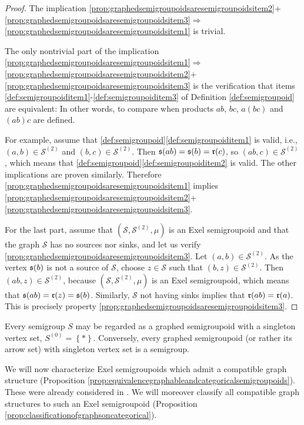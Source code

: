 \begin{proof}
    The implication \ref{prop:graphedsemigroupoidsaresemigroupoidsitem2}+\ref{prop:graphedsemigroupoidsaresemigroupoidsitem3}$\Rightarrow$\ref{prop:graphedsemigroupoidsaresemigroupoidsitem1} is trivial.
    
    The only nontrivial part of the implication \ref{prop:graphedsemigroupoidsaresemigroupoidsitem1}$\Rightarrow$\ref{prop:graphedsemigroupoidsaresemigroupoidsitem2}+\ref{prop:graphedsemigroupoidsaresemigroupoidsitem3} is the verification that items \ref{def:semigroupoiditem1}-\ref{def:semigroupoiditem3} of Definition \ref{def:semigroupoid} are equivalent: In other words, to compare when products $ab$, $bc$, $a(bc)$ and $(ab)c$ are defined.
    
    For example, assume that \ref{def:semigroupoid}\ref{def:semigroupoiditem1} is valid, i.e., $(a,b)\in\mathcal{S
    }^{(2)}$ and $(b,c)\in\mathcal{S
    }^{(2)}$. Then $\operatorname{\mathfrak{s}}(ab)=\operatorname{\mathfrak{s}}(b)=\operatorname{\mathfrak{r}}(c)$, so $(ab,c)\in\mathcal{S
    }^{(2)}$, which means that \ref{def:semigroupoid}\ref{def:semigroupoiditem2} is valid. The other implications are proven similarly. Therefore \ref{prop:graphedsemigroupoidsaresemigroupoidsitem1} implies \ref{prop:graphedsemigroupoidsaresemigroupoidsitem2}+\ref{prop:graphedsemigroupoidsaresemigroupoidsitem3}.
    
    For the last part, assume that $(\mathcal{S
    },\mathcal{S
    }^{(2)},\mu)$ is an Exel semigroupoid and that the graph $\mathcal{S
    }$ has no sources nor sinks, and let us verify \ref{prop:graphedsemigroupoidsaresemigroupoidsitem3}. Let $(a,b)\in\mathcal{S
    }^{(2)}$. As the vertex $\operatorname{\mathfrak{s}}(b)$ is not a source of $\mathcal{S
    }$, choose $z\in\mathcal{S
    }$ such that $(b,z)\in\mathcal{S
    }^{(2)}$. Then $(ab,z)\in\mathcal{S
    }^{(2)}$, because $(\mathcal{S
    },\mathcal{S
    }^{(2)},\mu)$ is an Exel semigroupoid, which means that $\operatorname{\mathfrak{s}}(ab)=\operatorname{\mathfrak{r}}(z)=\operatorname{\mathfrak{s}}(b)$. Similarly, $\mathcal{S
    }$ not having sinks implies that $\operatorname{\mathfrak{r}}(ab)=\operatorname{\mathfrak{r}}(a)$. This is precisely property \ref{prop:graphedsemigroupoidsaresemigroupoidsitem3}.\qedhere
\end{proof}

\begin{example}
Every semigroup $S$ may be regarded as a graphed semigroupoid with a singleton vertex set, $S^{(0)}=\left\{\ast\right\}$. Conversely, every graphed semigroupoid (or rather its arrow set) with singleton vertex set is a semigroup.
\end{example}

We will now characterize Exel semigroupoids which admit a compatible graph structure (Proposition \ref{prop:equivalencegraphableandcategoricalsemigroupoids}). These were already considered in \cite{MR2419901}. We will moreover classify all compatible graph structures to such an Exel semigroupoid (Proposition \ref{prop:classificationofgraphsoncategorical}).

